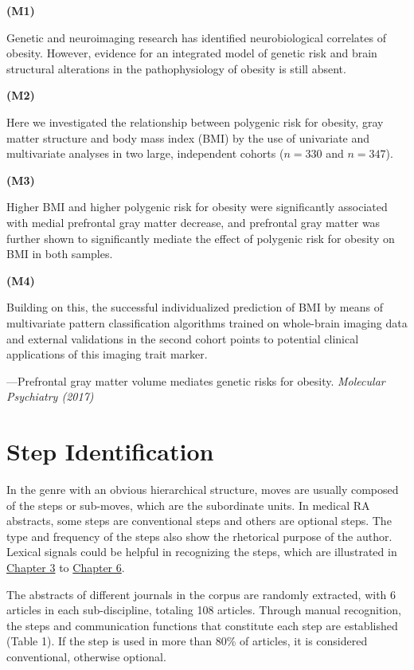 \documentclass[a4paper]{ctexbook}
\begin{document}
\begin{sample}[label={myautocounter}]{\heiti}
\textbf{(M1)}

Genetic and neuroimaging research has identified neurobiological correlates of obesity. However, evidence for an integrated model of genetic risk and brain structural alterations in the pathophysiology of obesity is still absent.

\textbf{(M2)}

Here we investigated the relationship between polygenic risk for obesity, gray matter structure and body mass index (BMI) by the use of univariate and multivariate analyses in two large, independent cohorts ($n=330$ and $n=347$).

\textbf{(M3)}

Higher BMI and higher polygenic risk for obesity were significantly associated with medial prefrontal gray matter decrease, and prefrontal gray matter was further shown to significantly mediate the effect of polygenic risk for obesity on BMI in both samples.

\textbf{(M4)}

Building on this, the successful individualized prediction of BMI by means of multivariate pattern classification algorithms trained on whole-brain imaging data and external validations in the second cohort points to potential clinical applications of this imaging trait marker.

\begin{flushright}
  ---Prefrontal gray matter volume mediates genetic risks for obesity. \emph{Molecular Psychiatry (2017)}
\end{flushright}

\end{sample}

\section{Step Identification}

In the genre with an obvious hierarchical structure, moves are usually composed of the steps or sub-moves, which are the subordinate units. In medical RA abstracts, some steps are conventional steps and others are optional steps. The type and frequency of the steps also show the rhetorical purpose of the author. Lexical signals could be helpful in recognizing the steps, which are illustrated in \hyperref[chapter3]{Chapter 3} to \hyperref[chapter6]{Chapter 6}.

The abstracts of different journals in the corpus are randomly extracted, with 6 articles in each sub-discipline, totaling 108 articles. Through manual recognition, the steps and communication functions that constitute each step are established (Table 1). If the step is used in more than 80\% of articles, it is considered conventional, otherwise optional.
\end{document}
